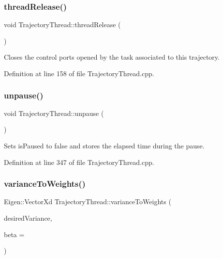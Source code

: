 \subsubsection{\texorpdfstring{thread\+Release()}{threadRelease()}}
{\footnotesize\ttfamily void Trajectory\+Thread\+::thread\+Release (\begin{DoxyParamCaption}{ }\end{DoxyParamCaption})\hspace{0.3cm}{\ttfamily [virtual]}}

Closes the control ports opened by the task associated to this trajectory. 

Definition at line 158 of file Trajectory\+Thread.\+cpp.

\hypertarget{classocra__recipes_1_1TrajectoryThread_ae5883c5bbd43285b1c548083219f709f}{}\label{classocra__recipes_1_1TrajectoryThread_ae5883c5bbd43285b1c548083219f709f} 
\subsubsection{\texorpdfstring{unpause()}{unpause()}}
{\footnotesize\ttfamily void Trajectory\+Thread\+::unpause (\begin{DoxyParamCaption}{ }\end{DoxyParamCaption})}

Sets is\+Paused to false and stores the elapsed time during the pause. 

Definition at line 347 of file Trajectory\+Thread.\+cpp.

\hypertarget{classocra__recipes_1_1TrajectoryThread_a80547ba585263055ad226a386ef18313}{}\label{classocra__recipes_1_1TrajectoryThread_a80547ba585263055ad226a386ef18313} 
\subsubsection{\texorpdfstring{variance\+To\+Weights()}{varianceToWeights()}}
{\footnotesize\ttfamily Eigen\+::\+Vector\+Xd Trajectory\+Thread\+::variance\+To\+Weights (\begin{DoxyParamCaption}\item[{Eigen\+::\+Vector\+Xd \&}]{desired\+Variance,  }\item[{const double}]{beta = {} }\end{DoxyParamCaption})\hspace{0.3cm}{\ttfamily [protected]}}



